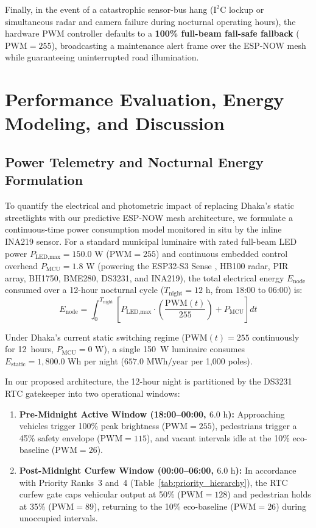 \documentclass[11pt,a4paper]{article}
\begin{document}
Finally, in the event of a catastrophic sensor-bus hang (\(\text{I}^2\text{C}\) lockup or simultaneous radar and camera failure during nocturnal operating hours), the hardware PWM controller defaults to a \textbf{100\% full-beam fail-safe fallback} (\(\text{PWM} = 255\)), broadcasting a maintenance alert frame over the ESP-NOW mesh \cite{espressif_espnow} while guaranteeing uninterrupted road illumination.

\section{Performance Evaluation, Energy Modeling, and Discussion}

\subsection{Power Telemetry and Nocturnal Energy Formulation}
To quantify the electrical and photometric impact of replacing Dhaka's static streetlights with our predictive ESP-NOW mesh architecture, we formulate a continuous-time power consumption model monitored in situ by the inline INA219 sensor. For a standard municipal luminaire with rated full-beam LED power \(P_{\text{LED,max}} = 150.0\text{ W}\) (\(\text{PWM} = 255\)) and continuous embedded control overhead \(P_{\text{MCU}} = 1.8\text{ W}\) (powering the ESP32-S3 Sense \cite{espressif_esp32s3}, HB100 radar, PIR array, BH1750, BME280, DS3231, and INA219), the total electrical energy \(E_{\text{node}}\) consumed over a 12-hour nocturnal cycle (\(T_{\text{night}} = 12\text{ h}\), from 18:00 to 06:00) is:
\begin{equation}
E_{\text{node}} = \int_{0}^{T_{\text{night}}} \left[ P_{\text{LED,max}} \cdot \left(\frac{\text{PWM}(t)}{255}\right) + P_{\text{MCU}} \right] dt
\label{eq:energy_integral}
\end{equation}

Under Dhaka's current static switching regime (\(\text{PWM}(t) = 255\) continuously for 12~hours, \(P_{\text{MCU}} = 0\text{ W}\)), a single 150~W luminaire consumes \(E_{\text{static}} = 1{,}800.0\text{ Wh}\) per night (\(657.0\text{ MWh/year}\) per 1,000 poles).

In our proposed architecture, the 12-hour night is partitioned by the DS3231 RTC gatekeeper into two operational windows:
\begin{enumerate}
    \item \textbf{Pre-Midnight Active Window (18:00--00:00, \(6.0\text{ h}\)):} Approaching vehicles trigger 100\% peak brightness (\(\text{PWM} = 255\)), pedestrians trigger a 45\% safety envelope (\(\text{PWM} = 115\)), and vacant intervals idle at the 10\% eco-baseline (\(\text{PWM} = 26\)).
    \item \textbf{Post-Midnight Curfew Window (00:00--06:00, \(6.0\text{ h}\)):} In accordance with Priority Ranks~3 and~4 (Table~\ref{tab:priority_hierarchy}), the RTC curfew gate caps vehicular output at 50\% (\(\text{PWM} = 128\)) and pedestrian holds at 35\% (\(\text{PWM} = 89\)), returning to the 10\% eco-baseline (\(\text{PWM} = 26\)) during unoccupied intervals.
\end{enumerate}
\end{document}
